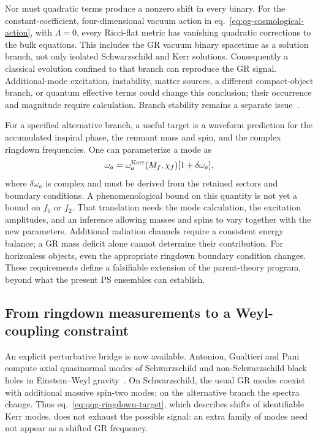 Nor must quadratic terms produce a nonzero shift in every binary.  For the constant-coefficient, four-dimensional vacuum action in eq.~\eqref{eq:qg-cosmological-action}, with $\Lambda=0$, every Ricci-flat metric has vanishing quadratic corrections to the bulk equations.  This includes the GR vacuum binary spacetime as a solution branch, not only isolated Schwarzschild and Kerr solutions.  Consequently a classical evolution confined to that branch can reproduce the GR signal.  Additional-mode excitation, instability, matter sources, a different compact-object branch, or quantum effective terms could change this conclusion; their occurrence and magnitude require calculation.  Branch stability remains a separate issue~\cite{HeldZhang:2023}.

For a specified alternative branch, a useful target is a waveform prediction for the accumulated inspiral phase, the remnant mass and spin, and the complex ringdown frequencies.  One can parameterize a mode as
\begin{equation}
 \omega_a=\omega_a^{\rm Kerr}(M_f,\chi_f)
            [1+\delta\omega_a],
 \label{eq:qqg-ringdown-target}
\end{equation}
where $\delta\omega_a$ is complex and must be derived from the retained sectors and boundary conditions.  A phenomenological bound on this quantity is not yet a bound on $f_0$ or $f_2$.  That translation needs the mode calculation, the excitation amplitudes, and an inference allowing masses and spins to vary together with the new parameters.  Additional radiation channels require a consistent energy balance; a GR mass deficit alone cannot determine their contribution.  For horizonless objects, even the appropriate ringdown boundary condition changes.  These requirements define a falsifiable extension of the parent-theory program, beyond what the present PS ensembles can establish.

\subsection{From ringdown measurements to a Weyl-coupling constraint}
\label{sec:weyl-ringdown-matching}

An explicit perturbative bridge is now available.  Antoniou, Gualtieri and Pani compute axial quasinormal modes of Schwarzschild and non-Schwarzschild black holes in Einstein--Weyl gravity~\cite{AntoniouGualtieriPani:2025}.  On Schwarzschild, the usual GR modes coexist with additional massive spin-two modes; on the alternative branch the spectra change.  Thus eq.~\eqref{eq:qqg-ringdown-target}, which describes shifts of identifiable Kerr modes, does not exhaust the possible signal: an extra family of modes need not appear as a shifted GR frequency.

